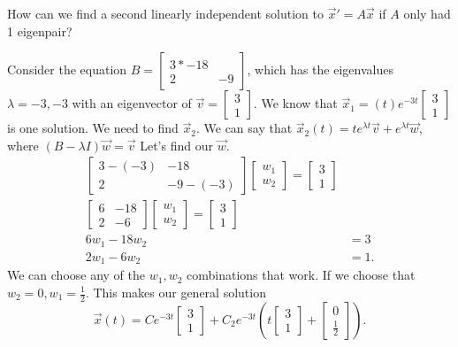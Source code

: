 How can we find a second linearly independent solution to $\vec{x}'=A\vec{x}$ if $A$ only had 1 eigenpair?
\begin{eg}
  Consider the equation $B=\begin{bmatrix} 3*-18\\2&-9 \end{bmatrix} $, which has the eigenvalues $\lambda=-3,-3$ with an eigenvector of $\vec{v}=\begin{bmatrix} 3\\1 \end{bmatrix} $. We know that $\vec{x}_1=(t)e^{-3t}\begin{bmatrix} 3\\1 \end{bmatrix} $ is one solution. We need to find $\vec{x}_2$. We can say that $\vec{x}_2(t)=te^{\lambda t}\vec{v}+e^{\lambda t}\vec{w}$, where $(B-\lambda I)\vec{w}=\vec{v}$ Let's find our $\vec{w}$.
  \begin{align*}
    \begin{bmatrix} 3-(-3)&-18\\2&-9-(-3) \end{bmatrix} \begin{bmatrix} w_1\\w_2 \end{bmatrix} =\begin{bmatrix} 3\\1 \end{bmatrix} \\
    \begin{bmatrix} 6&-18\\2&-6 \end{bmatrix} \begin{bmatrix} w_1\\w_2 \end{bmatrix} =\begin{bmatrix} 3\\1 \end{bmatrix} \\
    6w_1-18w_2&=3\\
    2w_1-6w_2&=1
  .\end{align*}
  We can choose any of the $w_1,w_2$ combinations that work. If we choose that $w_2=0,w_1=\frac{1}{2}$. This makes our general solution \[
    \vec{x}(t)=Ce^{-3t}\begin{bmatrix} 3\\1 \end{bmatrix} +C_2e^{-3t}\left( t\begin{bmatrix} 3\\1 \end{bmatrix} +\begin{bmatrix} 0\\\frac{1}{2} \end{bmatrix}  \right) 
  .\] 
\end{eg}

